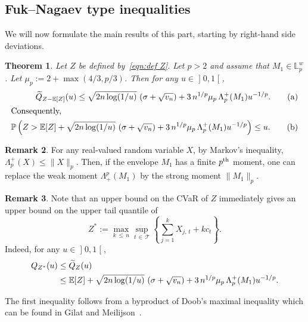 \documentclass[10pt]{amsart}
\newtheorem{theo}{Theorem}[section]
\theoremstyle{definition}\newtheorem{defi}[theo]{Definition}\newtheorem{rema}[theo]{Remark}\newtheorem{exam}[theo]{Example}\newtheorem{exem}[theo]{Example}\newtheorem{nota}[theo]{Notation}
\newcommand{\bE}{\mathbb{E}}
\newcommand{\bL}{\mathbb{L}}
\newcommand{\bP}{\mathbb{P}}
\newcommand{\cT}{\mathcal{T}}
\newcommand{\intervalleoo}[2]{\mathopen{]} #1\mathclose{}\mathpunct{},#2\mathclose{[}}
\let\oldtilde\tilde
\renewcommand*{\tilde}[1]{\mathchoice{\widetilde{#1}}{\widetilde{#1}}{\oldtilde{#1}}{\oldtilde{#1}}}
\begin{document}
\subsection{Fuk--Nagaev type inequalities}

We will now formulate the main results of this part, starting by right-hand side deviations.


\begin{theo}\label{thm:FukNagaev from Rio right}
Let $Z$ be defined by~\eqref{eqn:def Z}. Let $p>2$ and assume that $M_1\in\bL_p^w$. Let $\mu_p:=2+\max(4/3, p/3)$. Then for any $u\in\intervalleoo 01$,
\begin{align}
\tilde Q_{Z-\bE[Z]}(u)\leq\sqrt{2n\log(1/u)}\,\left(\sigma+\sqrt{v_n}\right)+3\,n^{1/p}\mu_p\,\Lambda_p^+(M_1) u^{-1/p}. \tag{$\rm a$}\label{theo2.1.a}
\\
\intertext{Consequently,}
\bP\left(Z>\bE[Z]+\sqrt{2n\log(1/u)}\,\left(\sigma+\sqrt{v_n}\right)+3\,n^{1/p}\mu_p\,\Lambda_p^+(M_1) u^{-1/p}\right)\leq u. \tag{$\rm b$}\label{theo2.1.b}
\end{align}
\end{theo}


\begin{rema}
For any real-valued random variable $X$, by Markov's inequality, $\Lambda_p^+(X)\leq\|X\|_p$. Then, if the envelope $M_1$ has a finite $p^{\rm th}$ moment, one can replace the weak moment $\Lambda_+^p(M_1)$ by the strong moment $\|M_1\|_p$.
\end{rema}

\begin{rema}
Note that an upper bound on the CVaR of $Z$ immediately gives an upper bound on the upper tail quantile of
\begin{equation}
Z^*:=\max_{k\,\leq\,n}\sup_{t\,\in\,\cT}\left\{\sum_{j=1}^k X_{j,\,t}+kc_t\right\}.
\end{equation}
Indeed, for any $u\in\intervalleoo 01$,
\begin{equation}
\begin{aligned}
Q_{Z^*}(u)&\leq \tilde Q_{Z}(u)\\
&\leq \bE[Z]+ \sqrt{2n\log(1/u)}\,\left(\sigma+\sqrt{v_n}\right)+3\,n^{1/p}\mu_p\,\Lambda_p^+(M_1) u^{-1/p}.
\end{aligned}
\end{equation}

The first inequality follows from a byproduct of Doob's maximal inequality which can be found in Gilat and Meilijson~\cite{GM88}.
\end{rema}
\end{document}
